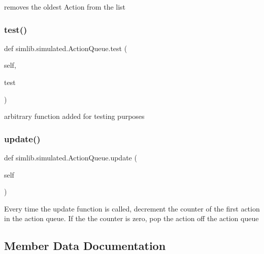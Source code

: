 \begin{DoxyVerb}removes the oldest Action from the list
\end{DoxyVerb}
 \mbox{\label{classsimlib_1_1simulated_1_1_action_queue_a4acc91e65e6844b9241436593bcb68c2}} 
\subsubsection{\texorpdfstring{test()}{test()}}
{\footnotesize\ttfamily def simlib.\+simulated.\+Action\+Queue.\+test (\begin{DoxyParamCaption}\item[{}]{self,  }\item[{}]{test }\end{DoxyParamCaption})}

\begin{DoxyVerb}arbitrary function added for testing purposes
\end{DoxyVerb}
 \mbox{\label{classsimlib_1_1simulated_1_1_action_queue_a81ac500fc4a41ee0fd8e75b2daa3269f}} 
\subsubsection{\texorpdfstring{update()}{update()}}
{\footnotesize\ttfamily def simlib.\+simulated.\+Action\+Queue.\+update (\begin{DoxyParamCaption}\item[{}]{self }\end{DoxyParamCaption})}

\begin{DoxyVerb}Every time the update function is called, decrement the counter of 
the first action in the action queue. If the the counter is zero, 
pop the action off the action queue
\end{DoxyVerb}
 

\subsection{Member Data Documentation}
\mbox{\label{classsimlib_1_1simulated_1_1_action_queue_ad16b72be1173c076a377ad76b105616d}} 
